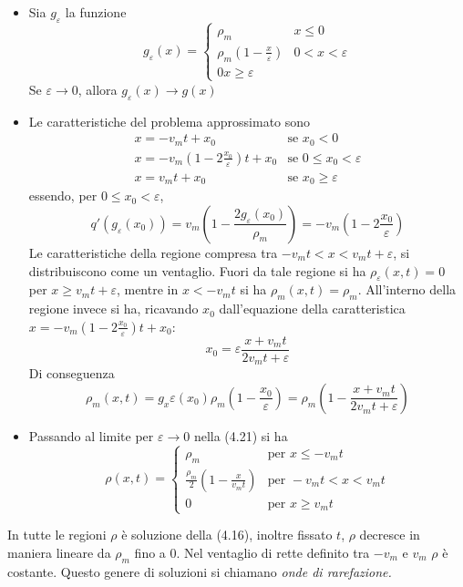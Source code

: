 \documentclass[a4paper,12pt, draft]{article}
\theoremstyle{break}
\let\epsilon\varepsilon
\numberwithin{equation}{section}
\begin{document}
\begin{itemize}
  \item Sia \(g_{\epsilon}\)  la funzione 
  \[
  g_{\epsilon} (x) = \begin{cases}
    \rho_m & x \leq 0 \\
    \rho_m(1-\frac{x}{\epsilon}) & 0 < x < \epsilon \\
    0 x \geq \epsilon
  \end{cases}  
  \]
  Se \(\epsilon \to 0\), allora \(g_{\epsilon}(x) \to g(x)\)
  \item Le caratteristiche del problema approssimato sono
  \begin{eqnarray*}
    x = - v_m t + x_0 & \mbox{se } x_0 < 0 \\
    x = -v_m \left(1 - 2\frac{x_0}{\epsilon}\right)t + x_0 & \mbox{se }0 \leq x_0 < \epsilon \\
    x = v_m t + x_0 & \mbox{se } x_0 \geq \epsilon
  \end{eqnarray*}
  essendo, per \(0 \leq x_0 < \epsilon\),
  \[
    q'(g_{\epsilon}(x_0)) = v_m \left(1 - \frac{2g_{\epsilon}(x_0)}{\rho_m}\right) = -v_m\left(1 - 2\frac{x_0}{\epsilon}\right)
  \]
Le caratteristiche della regione compresa tra \(-v_m t < x < v_m t + \epsilon\), si distribuiscono come un ventaglio. Fuori da tale regione si ha \(\rho_{\epsilon}(x, t) = 0\) per \(x \geq v_m t + \epsilon\), mentre in \(x < -v_mt\) si ha \(\rho_m (x, t) = \rho_m\). All'interno della regione invece si ha, ricavando \(x_0\) dall'equazione della caratteristica \(x = -v_m\left(1 - 2\frac{x_0}{\epsilon}\right)t + x_0\):
\[
  x_0 = \epsilon \frac{x + v_m t}{2v_m t + \epsilon}
\] 
Di conseguenza
\begin{equation}
  \rho_m (x,t) = g_x{\epsilon} (x_0) \rho_m \left(1- \frac{x_0}{\epsilon}\right) = \rho_m \left( 1 - \frac{x + v_m t}{2 v_m t + \epsilon}\right)
\end{equation}
\item Passando al limite per \(\epsilon \to 0\) nella (4.21) si ha 
\begin{equation}
  \rho(x,t) = \begin{cases}
    \rho_m & \mbox{per }x \leq -v_mt \\
    \frac{\rho_m}{2} \left(1 - \frac{x}{v_m t}\right) & \mbox{per } -v_m t < x < v_m t \\
    0 & \mbox{per } x \geq v_m t
  \end{cases}
\end{equation}
\end{itemize}
In tutte le regioni \(\rho\) è soluzione della (4.16), inoltre fissato \(t\), \(\rho\) decresce in maniera lineare da \(\rho_m\) fino a \(0\). Nel ventaglio di rette definito tra \(-v_m \mbox{ e } v_m\) \(\rho\) è costante. Questo genere di soluzioni si chiamano \emph{onde di rarefazione.} \\ 
\end{document}
